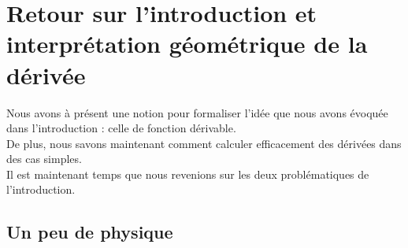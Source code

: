 \documentclass[a4paper,fontsize=13pt]{scrreprt}
\theoremstyle{plain}
\theoremstyle{definition}
\newtheorem*{solu}{Solution}
\newcommand{\rr}{\mathbb{R}}
\newenvironment{benumerate}[1][0pt]{\begin{enumerate}\renewcommand{\makelabel}[1]{\textbf{##1}}\setlength{\itemsep}{#1}}{\end{enumerate}}
\begin{document}

\chapter{Retour sur l'introduction et interprétation géométrique de la dérivée}
Nous avons à présent une notion pour formaliser l'idée que nous avons évoquée dans l'introduction : celle de fonction dérivable.\\
De plus, nous savons maintenant comment calculer efficacement des dérivées dans des cas simples.\\
Il est maintenant temps que nous revenions sur les deux problématiques de l'introduction.

\section{Un peu de physique}
\end{document}
